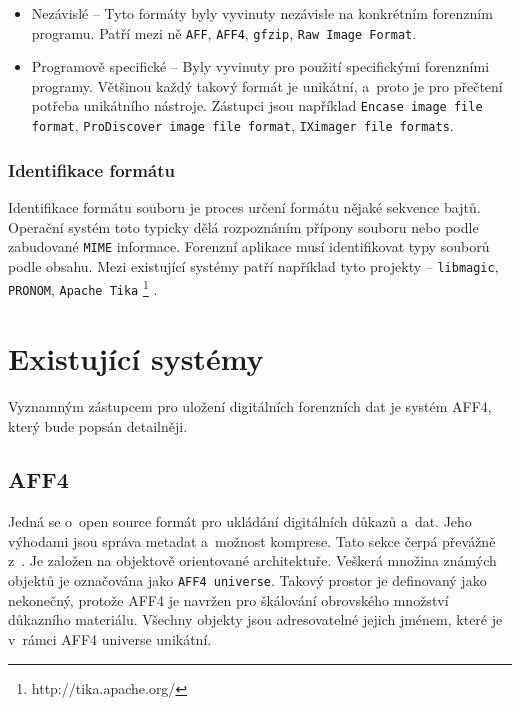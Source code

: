 \begin{itemize}
\item Nezávislé -- Tyto formáty byly vyvinuty nezávisle na konkrétním forenzním programu. Patří mezi ně \texttt{AFF}, \texttt{AFF4}, \texttt{gfzip}, \texttt{Raw Image Format}.

\item Programově specifické -- Byly vyvinuty pro použití specifickými forenzními programy. Většinou každý takový formát je unikátní, a~proto je pro přečtení potřeba unikátního nástroje.
Zástupci jsou například \texttt{Encase image file format}, \texttt{ProDiscover image file format}, \texttt{IXimager file formats}.
\end{itemize}

\subsubsection{Identifikace formátu}
Identifikace formátu souboru je proces určení formátu nějaké sekvence bajtů. Operační systém toto typicky dělá rozpoznáním přípony souboru nebo podle zabudované \texttt{MIME} informace. Forenzní aplikace musí identifikovat typy souborů podle obsahu. Mezi existující systémy patří například tyto projekty -- \texttt{libmagic}, \texttt{PRONOM}, \texttt{Apache Tika} \footnote{http://tika.apache.org/} \cite{forensicswikiFFIdentification}.

\section{Existující systémy}
Vyznamným zástupcem pro uložení digitálních forenzních dat je systém AFF4, který bude popsán detailněji.

\subsection{AFF4}
Jedná se o~open source formát pro ukládání digitálních důkazů a~dat. Jeho výhodami jsou správa metadat a~možnost komprese. Tato sekce čerpá převážně z~\cite{aff4}. Je založen na objektově orientované architektuře. Veškerá množina známých objektů je označována jako \texttt{AFF4 universe}. Takový prostor je definovaný jako nekonečný, protože AFF4 je navržen pro škálování obrovského množství důkazního materiálu. Všechny objekty jsou adresovatelné jejich jménem, které je v~rámci AFF4 universe unikátní.

\vspace{0.5cm}

